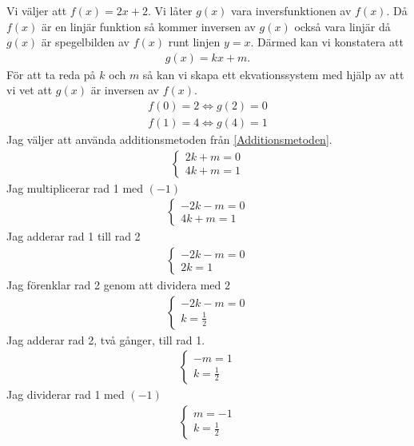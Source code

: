 Vi väljer att $f(x) = 2x + 2$. Vi låter $g(x)$ vara inversfunktionen av $f(x)$. Då $f(x)$ är en linjär funktion så kommer inversen av $g(x)$ också vara linjär då $g(x)$ är spegelbilden av $f(x)$ runt linjen $y=x$. Därmed kan vi konstatera att
\begin{align}
	g(x)=kx+m.
\end{align}
För att ta reda på $k$ och $m$ så kan vi skapa ett ekvationssystem med hjälp av att vi vet att $g(x)$ är inversen av $f(x)$.
\begin{align}
	f(0) = 2 \Leftrightarrow g(2) = 0 \\
	f(1)=4 \Leftrightarrow g(4)=1
\end{align}
Jag väljer att använda additionsmetoden från \ref{Additionsmetoden}.
\begin{align}
	\begin{cases}
		2k+m = 0 \\
		4k+m = 1
	\end{cases}
\end{align}
Jag multiplicerar rad 1 med $(-1)$
\begin{align}
	\begin{cases}
		-2k-m = 0 \\
		4k+m = 1
	\end{cases}
\end{align}
Jag adderar rad 1 till rad 2
\begin{align}
	\begin{cases}
		-2k-m = 0 \\
		2k = 1
	\end{cases}
\end{align}
Jag förenklar rad 2 genom att dividera med $2$
\begin{align}
	\begin{cases}
		-2k-m = 0 \\
		k = \frac{1}{2}
	\end{cases}
\end{align}
Jag adderar rad 2, två gånger, till rad 1.
\begin{align}
	\begin{cases}
		-m = 1 \\
		k = \frac{1}{2}
	\end{cases}
\end{align}
Jag dividerar rad 1 med $(-1)$
\begin{align}
	\begin{cases}
		m = -1 \\
		k = \frac{1}{2}
	\end{cases}
\end{align}

